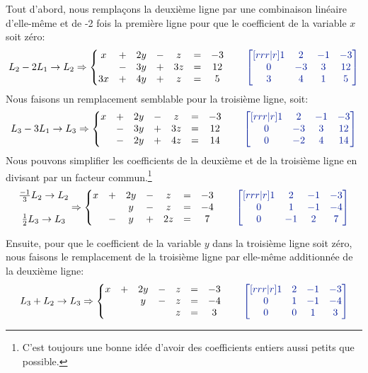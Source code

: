 Tout d'abord, nous remplaçons la deuxième ligne par une combinaison linéaire
d'elle-même et de -2 fois la première ligne 
pour que le coefficient de la variable $x$ soit zéro:
\[
L_2 -2L_1 \rightarrow L_2 \Rightarrow
\left\{
	\begin{matrix}
	x &+& 2y &-& z &=& -3\\
	 &-& 3y &+& 3z &=& 12\\
	3x &+& 4y &+& z &=& 5
	\end{matrix}\right.
	\qquad\color{ExerciceCouleur}
	\begin{bmatrix}[rrr|r]
1 & 2 & -1 & -3 \\
0 & -3 & 3 & 12 \\
3 & 4 & 1 & 5
\end{bmatrix}
\]
Nous faisons un remplacement semblable pour la troisième ligne, soit:
\[
L_3 -3L_1 \rightarrow L_3 \Rightarrow
\left\{
	\begin{matrix}
	x &+& 2y &-& z &=& -3\\
	&-& 3y &+& 3z &=& 12\\
	&-& 2y &+& 4z &=& 14
	\end{matrix}\right.
	\qquad\color{ExerciceCouleur}
	\begin{bmatrix}[rrr|r]
1 & 2 & -1 & -3 \\
0 & -3 & 3 & 12 \\
0 & -2 & 4 & 14
\end{bmatrix}	
\]
Nous pouvons simplifier les coefficients de la deuxième et de la troisième
ligne en divisant par un facteur commun.\footnote{C'est toujours une bonne
idée d'avoir des coefficients entiers aussi petits que possible.}
\[
\begin{matrix}
\frac{-1}{3}L_2 \rightarrow L_2 \\
\\
\frac{1}{2}L_3 \rightarrow L_3
\end{matrix}
 \Rightarrow
\left\{
	\begin{matrix}
	x &+& 2y &-& z &=& -3\\
	&& y &-& z &=& -4\\
	&-& y &+& 2z &=& 7
	\end{matrix}\right.
	\qquad\color{ExerciceCouleur}
	\begin{bmatrix}[rrr|r]
1 & 2 & -1 & -3 \\
0 & 1 & -1 & -4 \\
0 & -1 & 2 & 7
\end{bmatrix}	
\]

Ensuite, pour que le coefficient de la variable $y$ dans la troisième ligne soit zéro,
nous faisons le remplacement de la troisième ligne par elle-même
additionnée de la deuxième ligne:
\[
L_3 + L_2 \rightarrow L_3 \Rightarrow\left\{
	\begin{matrix}
	x &+& 2y &-& z &=& -3\\
	&& y &-& z &=& -4\\
	&&  && z &=& 3
	\end{matrix}\right.
	\qquad\color{ExerciceCouleur}
	\begin{bmatrix}[rrr|r]
1 & 2 & -1 & -3 \\
0 & 1 & -1 & -4 \\
0 & 0 & 1 & 3
\end{bmatrix}	
\]

